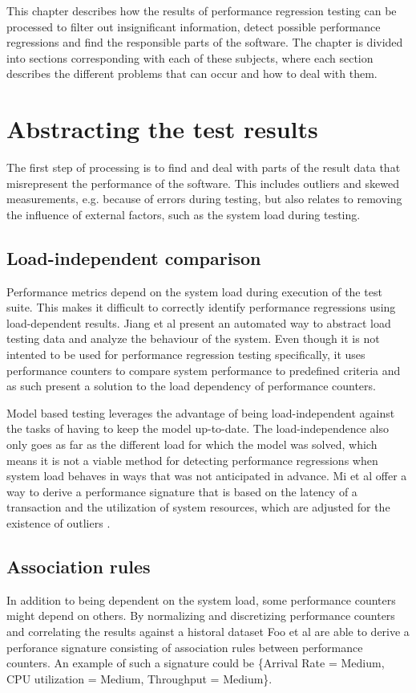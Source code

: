 
This chapter describes how the results of performance regression testing can be processed to filter out insignificant information, detect possible performance regressions and find the responsible parts of the software. The chapter is divided into sections corresponding with each of these subjects, where each section describes the different problems that can occur and how to deal with them.

\section{Abstracting the test results}
The first step of processing is to find and deal with parts of the result data that misrepresent the performance of the software. This includes outliers and skewed measurements, e.g. because of errors during testing, but also relates to removing the influence of external factors, such as the system load during testing.

\subsection{Load-independent comparison}
Performance metrics depend on the system load during execution of the test suite. This makes it difficult to correctly identify performance regressions using load-dependent results. Jiang et al present an automated way to abstract load testing data and analyze the behaviour of the system. \cite{jiang2010automated} Even though it is not intented to be used for performance regression testing specifically, it uses performance counters to compare system performance to predefined criteria and as such present a solution to the load dependency of performance counters.

Model based testing leverages the advantage of being load-independent against the tasks of having to keep the model up-to-date. The load-independence also only goes as far as the different load for which the model was solved, which means it is not a viable method for detecting performance regressions when system load behaves in ways that was not anticipated in advance. Mi et al offer a way to derive a performance signature that is based on the latency of a transaction and the utilization of system resources, which are adjusted for the existence of outliers \cite{mi2008analysis}.

\subsection{Association rules}
In addition to being dependent on the system load, some performance counters might depend on others. By normalizing and discretizing performance counters and correlating the results against a historal dataset Foo et al are able to derive a perforance signature \cite{foo2010mining} consisting of association rules between performance counters. An example of such a signature could be \{Arrival Rate = Medium, CPU utilization = Medium, Throughput = Medium\}.

